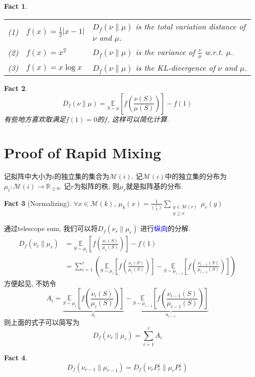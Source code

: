 \documentclass{article}
\newtheorem{fact}{Fact}
\def\~{\sim}
\def\R{\mathbb{R}}
\def\E_#1#2{\underset{#1}{\mathbb{E}}\left[#2\right]}
\begin{document}
\begin{fact} \ \\
  \begin{tabular}{lll}
    (1) & $f(x) = \frac{1}{2}|x-1|$ & $D_f(\nu\parallel\mu)$ is the total variation distance of $\nu$ and $\mu$. \\
    (2) & $f(x) = x^2$ & $D_f(\nu\parallel\mu)$ is the variance of $\frac{\nu}{\mu}$ w.r.t. $\mu$. \\
    (3) & $f(x) = x\log x$ & $D_f(\nu\parallel\mu)$ is the KL-divergence of $\nu$ and $\mu$.
  \end{tabular}
\end{fact}

\begin{fact}
  \[D_f(\nu\parallel\mu) = \E_{S\~\mu}{f(\frac{\nu(S)}{\mu(S)})} - f(1)\]
  有些地方喜欢取满足$f(1) = 0$的$f$, 这样可以简化计算.
\end{fact}

\section{Proof of Rapid Mixing}
记拟阵中大小为$i$的独立集的集合为$\mathcal{M}(i)$.
记$\mathcal{M}(i)$中的独立集的分布为$\mu_i:\mathcal{M}(i)\to\R_{\geq 0}$.
记$r$为拟阵的秩, 则$\mu_r$就是拟阵基的分布.
\begin{fact}[Normalizing]
  $\forall x \in \mathcal{M}(k)$, $\mu_k(x) = \frac{1}{\binom{r}{k}}\sum_{\substack{y\in\mathcal{M}(r)\\y\supseteq x}}\mu_r(y)$
\end{fact}
通过telescope sum, 我们可以将$D_f(\nu_r\parallel \mu_r)$ 进行\textcolor{blue}{纵向}的分解.
\begin{align*}
  D_f(\nu_r \parallel \mu_r)
  &= \E_{S\~\mu_r}{f(\frac{\nu_r(S)}{\mu_r(S)})} - f(1) \\
  &= \sum_{i=1}^r (\E_{S\~\mu_i}{f(\frac{\nu_i(S)}{\mu_i(S)})} - \E_{S\~\mu_{i-1}}{f(\frac{\nu_{i-1}(S)}{\mu_{i-1}(S)})})
\end{align*}
方便起见, 不妨令
\[A_i = \underbrace{\E_{S\~\mu_i}{f(\frac{\nu_i(S)}{\mu_i(S)})}}_{a_i} - \underbrace{\E_{S\~\mu_{i-1}}{f(\frac{\nu_{i-1}(S)}{\mu_{i-1}(S)})}}_{a_{i-1}}\]
则上面的式子可以简写为
\[D_f(\nu_r \parallel \mu_r) = \sum_{i=1}^r A_i\]


\begin{fact}
  \[D_f(\nu_{r-1} \parallel \mu_{r-1}) = D_f(\nu_rP_r^\downarrow\parallel\mu_rP_r^\downarrow)\]
\end{fact}
\end{document}
